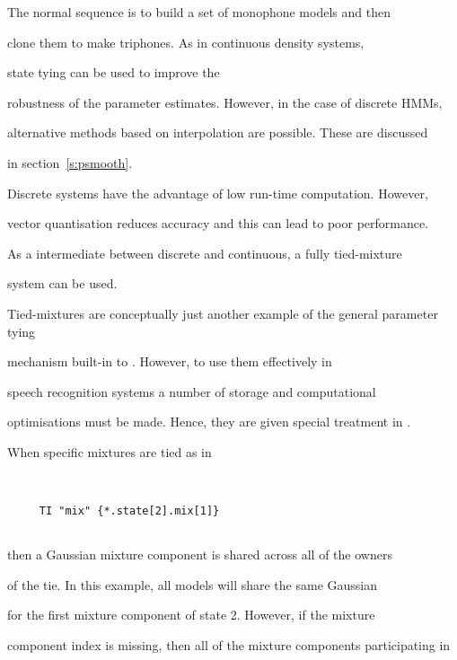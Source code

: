 The normal sequence is to build a set of monophone models and then


clone them to make triphones.  As in continuous density systems, 


state tying can be used to improve the


robustness of the parameter estimates.  However, in the case of discrete HMMs,


alternative methods based on interpolation are possible.  These are discussed


in section~\ref{s:psmooth}.












Discrete systems have the advantage of low run-time computation.  However,


vector quantisation reduces accuracy and this can lead to poor performance.


As a intermediate between discrete and continuous, a fully tied-mixture


system can be used.


Tied-mixtures are conceptually just another example of the general parameter tying


mechanism built-in to \HTK.  However, to use them effectively in


speech recognition systems a number of storage and computational 


optimisations must be made.  Hence, they are given special treatment in \HTK.





When specific mixtures are tied as in 


\begin{verbatim}


     TI "mix" {*.state[2].mix[1]} 


\end{verbatim}


then a Gaussian mixture component is shared across all of the owners


of the tie.  In this example, all models will share the same Gaussian


for the first mixture component of state 2.  However, if the mixture


component index is missing, then all of the mixture components participating in


